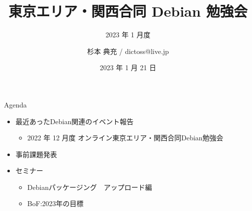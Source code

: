 \title{東京エリア・関西合同 Debian 勉強会}
\subtitle{2023 年 1 月度} %
\author{杉本 典充 / dictoss@live.jp}
\date{2023 年 1 月 21 日}



\begin{frame}
\titlepage{}
\end{frame}

\begin{frame}{Agenda}
 \begin{minipage}[t]{0.45\hsize}
  \begin{itemize}
  \item 最近あったDebian関連のイベント報告
    \begin{itemize}
    \item 2022 年 12 月度 オンライン東京エリア・関西合同Debian勉強会
    \end{itemize}
  \item 事前課題発表
  \end{itemize}
 \end{minipage}
 \begin{minipage}[t]{0.45\hsize}
   \begin{itemize}
   \item セミナー
     \begin{itemize}
     \item Debianパッケージング　アップロード編
     \item BoF:2023年の目標
     \end{itemize}
  \end{itemize}
 \end{minipage}
\end{frame}

